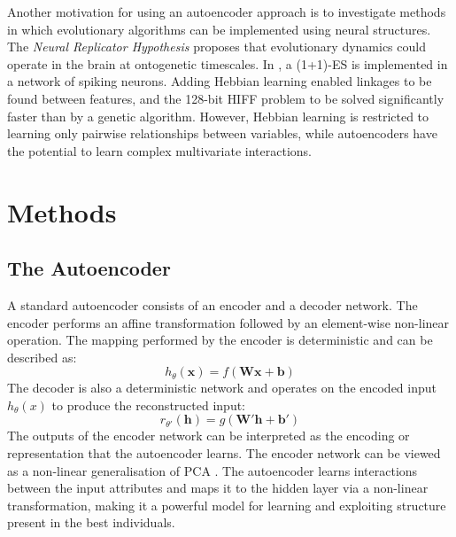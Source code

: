 \documentclass[twoside]{article}
\begin{document}
Another motivation for using an autoencoder approach is to investigate methods in which evolutionary algorithms can be implemented using neural structures. The {\em{Neural Replicator Hypothesis}} \cite{fernando2010neuronal} proposes that evolutionary dynamics could operate in the brain at ontogenetic timescales. In \cite{fernando2010neuronal}, a (1+1)-ES is implemented in a network of spiking neurons. Adding Hebbian learning enabled linkages to be found between features, and the 128-bit HIFF problem to be solved significantly faster than by a genetic algorithm. However, Hebbian learning is restricted to learning only pairwise relationships between variables, while autoencoders have the potential to learn complex multivariate interactions.

\section{Methods}

\subsection{The Autoencoder}


A standard autoencoder consists of an encoder and a decoder network. The encoder performs an affine transformation followed by an element-wise non-linear operation. The mapping performed by the encoder is deterministic and can be described as: $$h_{\theta}(\mathbf{x}) = f(\mathbf{Wx + b})$$ The decoder is also a deterministic network and operates on the encoded input $h_{\theta}(x)$ to produce the reconstructed input: $$ r_{\theta'}(\mathbf{h}) = g(\mathbf{W'h + b'})$$ The outputs of the encoder network can be interpreted as the encoding or representation that the autoencoder learns. The encoder network can be viewed as a non-linear generalisation of PCA \cite{hinton2006reducing}. The autoencoder learns interactions between the input attributes and maps it to the hidden layer via a non-linear transformation, making it a powerful model for learning and exploiting structure present in the best individuals.
\end{document}
